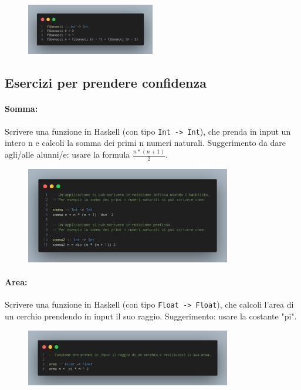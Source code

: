 \begin{figure}[!h]
    \centering
    \includegraphics[width=0.5\textwidth]{images/Fibonacci.png}
\end{figure}

\subsection{Esercizi per prendere confidenza}

\paragraph{Somma:} Scrivere una funzione in Haskell (con tipo \texttt{Int -> Int}), 
che prenda in input un intero n e calcoli la somma dei primi n numeri naturali. Suggerimento da dare agli/alle alunni/e: usare la 
formula $\frac{n * (n+1)}{2}$.

\begin{figure}[!h]
    \centering
    \includegraphics[width=0.8\textwidth]{images/Somma.png}
\end{figure}

\paragraph{Area:} Scrivere una funzione in Haskell (con tipo \texttt{Float -> Float}), 
che calcoli l'area di un cerchio prendendo in input il suo raggio. Suggerimento: usare la costante "pi".

\begin{figure}[!h]
    \centering
    \includegraphics[width=0.8\textwidth]{images/Area.png}
\end{figure}
\pagebreak
